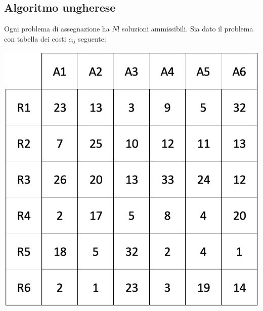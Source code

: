 \documentclass[12pt,a4paper]{article}
\begin{document}
\subsection{Algoritmo ungherese}
Ogni problema di assegnazione ha $N!$ soluzioni ammissibili.
Sia dato il problema con tabella dei costi $c_{ij}$ seguente:
\begin{center}
\includegraphics[width=0.4\columnwidth]{img/pb_assegnazione.png}\\
\end{center}
\end{document}
